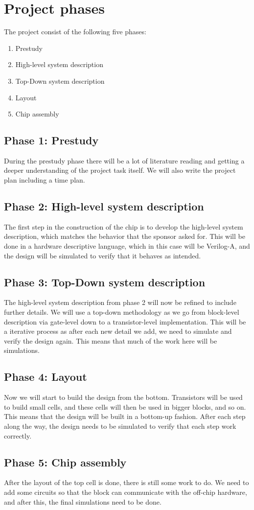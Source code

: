 \section{Project phases}
The project consist of the following five phases:
\begin{enumerate}
\item Prestudy
\item High-level system description
\item Top-Down system description
\item Layout
\item Chip assembly
\end{enumerate}

\subsection{Phase 1: Prestudy}
During the prestudy phase there will be a lot of literature reading and getting a deeper understanding of the project task itself. We will also write the project plan including a time plan. 

\subsection{Phase 2: High-level system description}
The first step in the construction of the chip is to develop the high-level system description, which matches the behavior that the sponsor asked for. This will be done in a hardware descriptive language, which in this case will be Verilog-A, and the design will be simulated to verify that it behaves as intended. 

\subsection{Phase 3: Top-Down system description}
The high-level system description from phase 2 will now be refined to include further details. We will use a top-down methodology as we go from block-level description via gate-level down to a transistor-level implementation. This will be a iterative process as after each new detail we add, we need to simulate and verify the design again. This means that much of the work here will be simulations.

\subsection{Phase 4: Layout}
Now we will start to build the design from the bottom. Transistors will be used to build small cells, and these cells will then be used in bigger blocks, and so on. This means that the design will be built in a bottom-up fashion. After each step along the way, the design needs to be simulated to verify that each step work correctly.

\subsection{Phase 5: Chip assembly}
After the layout of the top cell is done, there is still some work to do. We need to add some circuits so that the block can communicate with the off-chip hardware, and after this, the final simulations need to be done.
